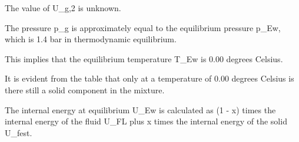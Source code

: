 The value of U_{g,2} is unknown.

The pressure p_g is approximately equal to the equilibrium pressure p_{Ew}, which is 1.4 bar in thermodynamic equilibrium.

This implies that the equilibrium temperature T_{Ew} is 0.00 degrees Celsius.

It is evident from the table that only at a temperature of 0.00 degrees Celsius is there still a solid component in the mixture.

The internal energy at equilibrium U_{Ew} is calculated as (1 - x) times the internal energy of the fluid U_{FL} plus x times the internal energy of the solid U_{fest}.